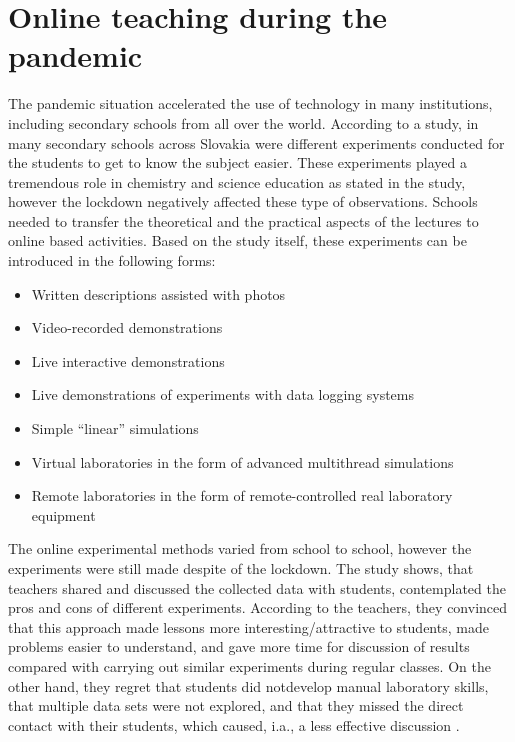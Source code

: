 \documentclass[10pt,oneside,english,a4paper]{article}
\begin{document}
\section{Online teaching during the pandemic}\label{covid}

	The pandemic situation accelerated the use of technology in many institutions, including secondary schools from all over the world. According to a study\cite{Babinkov2020}, in many secondary schools across Slovakia were different experiments conducted for the students to get to know the subject easier. These experiments played a tremendous role in chemistry and science education as stated in the study, however the lockdown negatively affected these type of observations. Schools needed to transfer the theoretical and the practical aspects of the lectures to online based activities. Based on the study itself\cite{Babinkov2020}, these experiments can be introduced in the following forms:
\begin{itemize}
\item Written descriptions assisted with photos
\item Video-recorded demonstrations
\item Live interactive demonstrations
\item Live demonstrations of experiments with data logging systems
\item Simple “linear” simulations
\item Virtual laboratories in the form of advanced multithread simulations
\item Remote laboratories in the form of remote-controlled real laboratory equipment
\end{itemize}

	The online experimental methods varied from school to school, however the experiments were still made despite of the lockdown. The study shows, that teachers shared and discussed the collected data with students, contemplated the pros and cons of different experiments. According to the teachers, they convinced that this approach made lessons more interesting/attractive to students, made problems easier to understand, and gave more time for discussion of results  compared with carrying out similar experiments during regular classes. On the other hand, they regret that students did notdevelop manual laboratory skills, that multiple data sets were not explored, and that they missed the direct contact with their students, which caused, i.a., a less effective discussion \cite{Babinkov2020}.
\end{document}
